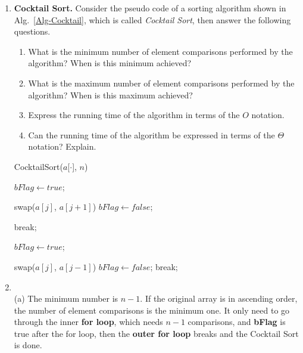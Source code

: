 \documentclass[12pt,a4paper]{article}
\makeatletter
\newtheorem*{solution}{Solution}
\theoremstyle{definition}
\renewenvironment{solution}[1][Solution] {\par\pushQED{\qed}\normalfont\topsep6\p@\@plus6\p@\relax\trivlist\item[\hskip\labelsep\bfseries#1\@addpunct{.}]\ignorespaces}{\popQED\endtrivlist\@endpefalse} \makeatother
\makeatother
\begin{document}
\begin{enumerate}

\item \textbf{Cocktail Sort.} Consider the pseudo code of a sorting algorithm shown in Alg.~\ref{Alg-Cocktail}, which is called \emph{Cocktail Sort}, then answer the following questions.


\begin{minipage}[t]{0.4\textwidth}
\begin{enumerate}
\item What is the minimum number of element comparisons performed by the algorithm? When is this minimum achieved?
\item What is the maximum number of element comparisons performed by the algorithm? When is this maximum achieved?
\item Express the running time of the algorithm in terms of the $O$ notation.
\item Can the running time of the algorithm be expressed in terms of the $\Theta$ notation? Explain.
\end{enumerate}
\end{minipage}
\hspace{2mm}
\begin{minipage}[t]{0.5\textwidth}
\begin{algorithm}[H]
		\caption{CocktailSort($a$[$\cdot$], $n$)} \label{Alg-Cocktail}
		{
			$bFlag \leftarrow true$;
			
			{
				{
					swap($a[j]$, $a[j+1]$)\;
					$bFlag \leftarrow false$;
				}
			}
			
			{
				break;
			}
			
			$bFlag \leftarrow true$;			
			
			{
				{
					swap($a[j]$, $a[j-1]$)\;
					$bFlag \leftarrow false$;
				}
			}
			{
				break;
			}
		}
\end{algorithm}
\end{minipage}

\begin{solution}
	~\\
	(a) The minimum number is $n-1$. If the original array is in ascending order, the number of element comparisons is the minimum one.
	It only need to go through the inner \textbf{for loop}, which needs $n-1$ comparisons, and  \textbf{bFlag} is true after the for loop, then the \textbf{outer for loop} breaks and the Cocktail Sort is done.
	

\end{solution}
\end{enumerate}
\end{document}
